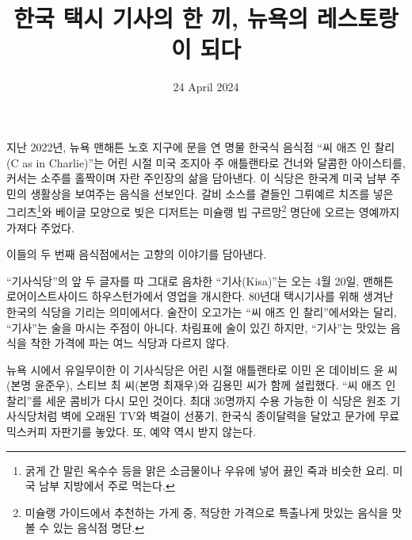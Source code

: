 \documentclass{translation}
\date{24 April 2024}
\title{한국 택시 기사의 한 끼, 뉴욕의 레스토랑이 되다}
\begin{document}
지난 2022년, 뉴욕 맨해튼 노호 지구에 문을 연 명물 한국식 음식점 ``씨 애즈 인 찰리(C as in Charlie)''는 어린 시절 미국 조지아 주 애틀랜타로 건너와 달콤한 아이스티를, 커서는 소주를 홀짝이며 자란 주인장의 삶을 담아낸다.
이 식당은 한국계 미국 남부 주민의 생활상을 보여주는 음식을 선보인다.
갈비 소스를 곁들인 그뤼예르 치즈를 넣은 그리츠\footnote{굵게 간 말린 옥수수 등을 맑은 소금물이나 우유에 넣어 끓인 죽과 비슷한 요리. 미국 남부 지방에서 주로 먹는다.}와 베이글 모양으로 빚은 디저트는 미슐랭 빕 구르망\footnote{미슐랭 가이드에서 추천하는 가게 중, 적당한 가격으로 특출나게 맛있는 음식을 맛볼 수 있는 음식점 명단.} 명단에 오르는 영예까지 가져다 주었다.
%

이들의 두 번째 음식점에서는 고향의 이야기를 담아낸다.
%

``기사식당''의 앞 두 글자를 따 그대로 음차한 ``기사(Kisa)''는 오는 4월 20일, 맨해튼 로어이스트사이드 하우스턴가에서 영업을 개시한다.
80년대 택시기사를 위해 생겨난 한국의 식당을 기리는 의미에서다.
술잔이 오고가는 ``씨 애즈 인 찰리''에서와는 달리, ``기사''는 술을 마시는 주점이 아니다.
차림표에 술이 있긴 하지만, ``기사''는 맛있는 음식을 착한 가격에 파는 여느 식당과 다르지 않다.
%

뉴욕 시에서 유일무이한 이 기사식당은 어린 시절 애틀랜타로 이민 온 데이비드 윤 씨(본명 윤준우), 스티브 최 씨(본명 최재우)와 김용민 씨가 함께 설립했다.
``씨 애즈 인 찰리''를 세운 콤비가 다시 모인 것이다.
최대 36명까지 수용 가능한 이 식당은 원조 기사식당처럼 벽에 오래된 TV와 벽걸이 선풍기, 한국식 종이달력을 달았고 문가에 무료 믹스커피 자판기를 놓았다.
또, 예약 역시 받지 않는다.
%
\end{document}

